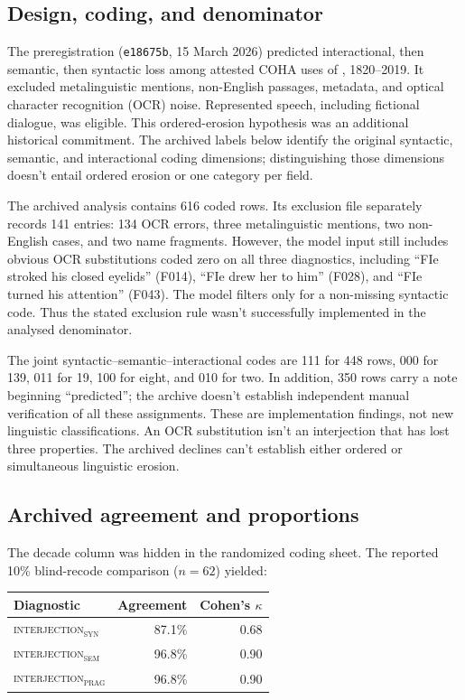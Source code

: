 \documentclass[12pt]{article}
\newcommand{\intj}[1]{\textsc{interjection\textsubscript{#1}}}
\begin{document}
\subsection{Design, coding, and denominator}

The preregistration (\texttt{e18675b}, 15 March 2026) predicted interactional, then semantic, then syntactic loss among attested COHA uses of , 1820--2019. It excluded metalinguistic mentions, non-English passages, metadata, and optical character recognition (OCR) noise. Represented speech, including fictional dialogue, was eligible. This ordered-erosion hypothesis was an additional historical commitment. The archived labels below identify the original syntactic, semantic, and interactional coding dimensions; distinguishing those dimensions doesn't entail ordered erosion or one category per field.

The archived analysis contains 616 coded rows. Its exclusion file separately records 141 entries: 134 OCR errors, three metalinguistic mentions, two non-English cases, and two name fragments. However, the model input still includes obvious OCR substitutions coded zero on all three diagnostics, including \enquote{FIe stroked his closed eyelids} (F014), \enquote{FIe drew her to him} (F028), and \enquote{FIe turned his attention} (F043). The model filters only for a non-missing syntactic code. Thus the stated exclusion rule wasn't successfully implemented in the analysed denominator.

The joint syntactic--semantic--interactional codes are 111 for 448 rows, 000 for 139, 011 for 19, 100 for eight, and 010 for two. In addition, 350 rows carry a note beginning \enquote{predicted}; the archive doesn't establish independent manual verification of all these assignments. These are implementation findings, not new linguistic classifications. An OCR substitution isn't an interjection that has lost three properties. The archived declines can't establish either ordered or simultaneous linguistic erosion.

\subsection{Archived agreement and proportions}

The decade column was hidden in the randomized coding sheet. The reported 10\% blind-recode comparison ($n = 62$) yielded:

\begin{center}
\begin{tabular}{lrr}
  \hline
  Diagnostic & Agreement & Cohen's $\kappa$ \\
  \hline
  \intj{syn} & 87.1\% & 0.68 \\
  \intj{sem} & 96.8\% & 0.90 \\
  \intj{prag} & 96.8\% & 0.90 \\
  \hline
\end{tabular}
\end{center}
\end{document}
